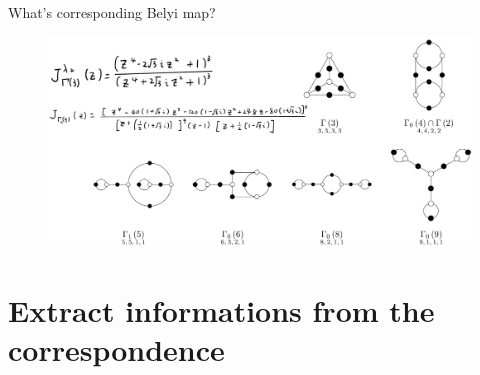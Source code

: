 \documentclass[pdf]{beamer}
\numberwithin{equation}{section}
\theoremstyle{plain}
\theoremstyle{plain}
\theoremstyle{remark}
\begin{document}
\begin{frame}[fragile]{What's corresponding Belyi map?}
\begin{figure}[th]
	\begin{minipage}[b]{\textwidth}
		\centering
		\includegraphics[width=\textwidth]{figures/hardquestion.png}
	\end{minipage}
\end{figure}
\end{frame}


\section{Extract informations from the correspondence}
\end{document}
